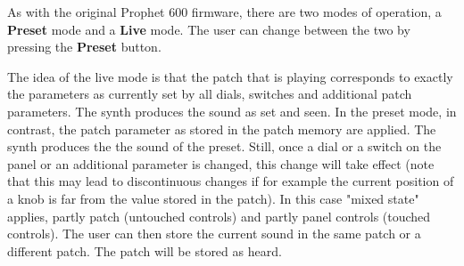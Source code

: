 As with the original Prophet 600 firmware, there are two modes of operation, a \textbf{Preset} mode and a \textbf{Live} mode. The user can change between the two by pressing the \textbf{Preset} button. 

The idea of the live mode is that the patch that is playing corresponds to exactly the parameters as currently set by all dials, switches and additional patch parameters. The synth produces the sound as set and seen. In the preset mode, in contrast, the patch parameter as stored in the patch memory are applied. The synth produces the the sound of the preset. Still, once a dial or a switch on the panel or an additional parameter is changed, this change will take effect (note that this may lead to discontinuous changes if for example the current position of a knob is far from the  value stored in the patch). In this case  "mixed state" applies, partly patch (untouched controls) and partly panel controls (touched controls). The user can then store the current sound in the same patch or a different patch. The patch will be stored as heard. 
